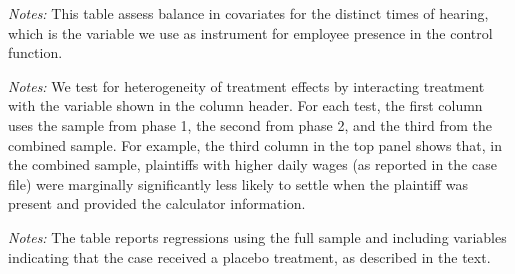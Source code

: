 \begin{table}[!ht]
    \caption{Time of hearing balance table}
    \label{pactor_balance}
    \begin{center}
    \scriptsize{}
    \end{center}
    \scriptsize
    \textit{Notes:} This table assess balance in covariates for the distinct times of hearing, which is the variable we use as instrument for employee presence in the control function.
     
\end{table}

\begin{table}[!ht]
    \caption{Heterogeneity in treatment effects}
    \label{te_heterogeneity}
    \begin{center}
    \scriptsize{}
    \end{center}
         \scriptsize
 \textit{Notes:} We test for heterogeneity of treatment effects by interacting treatment with the variable shown in the column header. For each test, the first column uses the sample from phase 1, the second from phase 2, and the third from the combined sample. For example, the third column in the top panel shows that, in the combined sample, plaintiffs with higher daily wages (as reported in the case file) were marginally significantly less likely to settle when the plaintiff was present and provided the calculator information. 
\end{table}


\begin{table}[!ht]
    \caption{Treatment Effects with placebo arm - Phase 1}
    \label{Table_effects_placebo}
    \begin{center}
    \scriptsize{}
    \end{center}
     \scriptsize
    \textit{Notes:} The table reports regressions using the full sample and including variables indicating that the case received a placebo treatment, as described in the text. 
         
\end{table}




